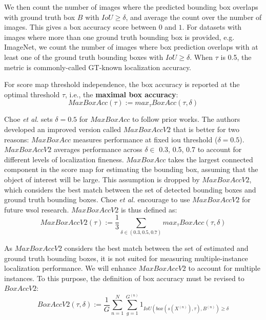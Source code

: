 We then count the number of images where the predicted bounding box overlaps with ground truth box $B$ with $IoU \ge \delta$, and average the count over the number of images. This gives a box accuracy score between $0$ and $1$. For datasets with images where more than one ground truth bounding box is provided, e.g. ImageNet, we count the number of images where box prediction overlaps with at least one of the ground truth bounding boxes with $IoU \ge \delta$. When $\tau$ is 0.5, the metric is commonly-called GT-known localization accuracy. 

For score map threshold independence, the box accuracy is reported at the optimal threshold $\tau$, i.e., the \textbf{maximal box accuracy}:
\begin{equation}
    MaxBoxAcc(\tau) := max_{\tau} BoxAcc(\tau,\delta)
\end{equation}

Choe \textit{et al.} \cite{choe2020evaluating} sets $\delta = 0.5$ for $MaxBoxAcc$ to follow prior works. The authors developed an improved version called $MaxBoxAccV2$ that is better for two reasons: $MaxBoxAcc$ measures performance at fixed \acrshort{iou} threshold ($\delta = 0.5$). $MaxBoxAccV2$ averages performance across $\delta \in$ {0.3, 0.5, 0.7} to account for different levels of localization fineness. $MaxBoxAcc$ takes the largest connected component in the score map for estimating the bounding box, assuming that the object of interest will be large. This assumption is dropped by $MaxBoxAccV2$, which considers the best match between the set of detected bounding boxes and ground truth bounding boxes. Choe \textit{et al.} encourage to use $MaxBoxAccV2$ for future \acrshort{wsol} research. $MaxBoxAccV2$ is thus defined as:
\begin{equation} \label{eq:maxboxaccv2}
    MaxBoxAccV2(\tau) := \frac{1}{3} \sum_{\delta \in (0.3,0.5,0.7)} max_{\tau} BoxAcc(\tau,\delta)
\end{equation}

As $MaxBoxAccV2$ considers the best match between the set of estimated and ground truth bounding boxes, it is not suited for measuring multiple-instance localization performance. We will enhance $MaxBoxAccV2$ to account for multiple instances. To this purpose, the definition of box accuracy must be revised to $BoxAccV2$:
\begin{equation} \label{eq:boxaccv2}
    BoxAccV2(\tau,\delta) := \frac{1}{G} \sum^{N}_{n=1} \sum^{G^{(n)}}_{g=1}  1_{IoU(box(s(X^{(n)}),\tau),B^{(n)})\ge\delta}
\end{equation}

